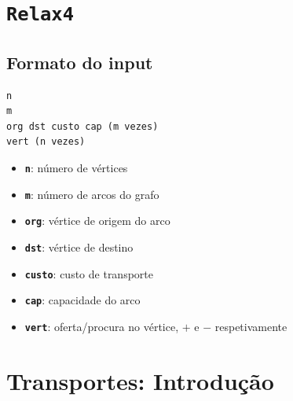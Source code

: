 \documentclass[10pt, a4paper]{article}
\begin{document}
 
\begin{multicols}{2}

\begin{center}
\end{center}

\thispagestyle{empty}



\section{\texttt{Relax4}}

\subsection{Formato do input}

\begin{lstlisting}
n
m
org dst custo cap (m vezes)
vert (n vezes)
\end{lstlisting}

\begin{itemize}
    \item \textbf{\texttt{n}}: número de vértices
    \item \textbf{\texttt{m}}: número de arcos do grafo
    \item \textbf{\texttt{org}}: vértice de origem do arco
    \item \textbf{\texttt{dst}}: vértice de destino
    \item \textbf{\texttt{custo}}: custo de transporte
    \item \textbf{\texttt{cap}}: capacidade do arco
    \item \textbf{\texttt{vert}}: oferta/procura no vértice, \(+\) e \(-\) respetivamente
\end{itemize}



\section{Transportes: Introdução}

%


\end{multicols}
\end{document}
